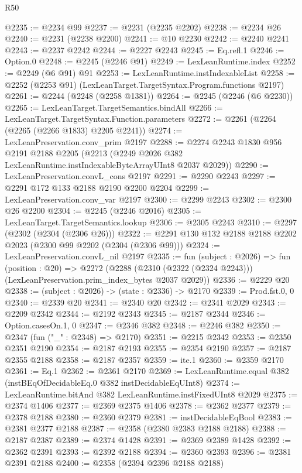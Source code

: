 \begin{lexlean}{R50}
\begin{coremodule}
@2235 := @2234 @99
@2237 := @2231 (@2235 @2202)
@2238 := @2234 @26
@2240 := @2231 (@2238 @2200)
@2241 := @10 @2230
@2242 := @2240 @2241
@2243 := @2237 @2242
@2244 := @2227 @2243
@2245 := Eq.refl.{1}
@2246 := Option.{0}
@2248 := @2245 (@2246 @91)
@2249 := LexLeanRuntime.index
@2252 := @2249 (@6 @91) @91
@2253 := LexLeanRuntime.instIndexableList
@2258 := @2252 (@2253 @91) (LexLeanTarget.TargetSyntax.Program.functions @2197)
@2261 := @2244 (@2248 (@2258 @1381))
@2264 := @2245 (@2246 (@6 @2230))
@2265 := LexLeanTarget.TargetSemantics.bindAll
@2266 := LexLeanTarget.TargetSyntax.Function.parameters
@2272 := @2261 (@2264 (@2265 (@2266 @1833) @2205 @2241))
@2274 := LexLeanPreservation.conv_prim @2197
@2288 := @2274
    @2243
    @1830
    @956
    @2191
    @2188
    @2205
    (@2213 (@2249 @2026 @382 LexLeanRuntime.instIndexableByteArrayUInt8 @2037 @2029))
@2290 := LexLeanPreservation.convL_cons @2197
@2291 := @2290 @2243
@2297 := @2291 @172 @133 @2188 @2190 @2200 @2204
@2299 := LexLeanPreservation.conv_var @2197
@2300 := @2299 @2243
@2302 := @2300 @26 @2200
@2304 := @2245 (@2246 @2016)
@2305 := LexLeanTarget.TargetSemantics.lookup
@2306 := @2305 @2243
@2310 := @2297 (@2302 (@2304 (@2306 @26)))
@2322 := @2291 @130 @132 @2188 @2188 @2202 @2023 (@2300 @99 @2202 (@2304 (@2306 @99)))
@2324 := LexLeanPreservation.convL_nil @2197
@2335 := fun (subject : @2026) =>
  fun (position : @20) =>
  @2272 (@2288 (@2310 (@2322 (@2324 @2243))) (LexLeanPreservation.prim_index_bytes @2037 @2029))
@2336 := @2229 @20
@2338 := (subject : @2026) -> (state : @2336) -> @2170
@2339 := Prod.fst.{0, 0}
@2340 := @2339 @20
@2341 := @2340 @20
@2342 := @2341 @2029
@2343 := @2209 @2342
@2344 := @2192 @2343
@2345 := @2187 @2344
@2346 := Option.casesOn.{1, 0}
@2347 := @2346 @382
@2348 := @2246 @382
@2350 := @2347 (fun ("_" : @2348) => @2170)
@2351 := @2215 @2342
@2353 := @2350 @2351 @2190
@2354 := @2187 @2193
@2355 := @2354 @2190
@2357 := @2187 @2355 @2188
@2358 := @2187 @2357
@2359 := ite.{1}
@2360 := @2359 @2170
@2361 := Eq.{1}
@2362 := @2361 @2170
@2369 := LexLeanRuntime.equal @382 (instBEqOfDecidableEq.{0} @382 instDecidableEqUInt8)
@2374 := LexLeanRuntime.bitAnd @382 LexLeanRuntime.instFixedUInt8 @2029
@2375 := @2374 @1406
@2377 := @2369 @2375 @1406
@2378 := @2362 @2377
@2379 := @2378 @2188
@2380 := @2360 @2379
@2381 := instDecidableEqBool
@2383 := @2381 @2377 @2188
@2387 := @2358 (@2380 @2383 @2188 @2188)
@2388 := @2187 @2387
@2389 := @2374 @1428
@2391 := @2369 @2389 @1428
@2392 := @2362 @2391
@2393 := @2392 @2188
@2394 := @2360 @2393
@2396 := @2381 @2391 @2188
@2400 := @2358 (@2394 @2396 @2188 @2188)

\end{coremodule}
\end{lexlean}
